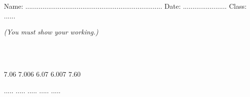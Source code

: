 \documentclass{article}
\date{}
\begin{document}
\fontsize{13}{15} \selectfont %

\begin{center}
  \qquad \\ 
\end{center} \\ 

Name: ........................................................................ \hspace{0.5cm}  Date: ....................... \hspace{0.5cm}  Class: ......

\par
\vspace*{10pt} 
\textit{(You must show your working.)  }
\vspace{10pt}

\hline
\vspace{10pt}

\par
{} \\
\vspace*{20pt}
\par

\begin{flushright}
\end{flushright}
 \vspace{10pt}

\hline
\vspace{10pt}

\par
{} \\

7.06 \hspace{3cm} 7.006 \hspace{3cm} 6.07 \hspace{3cm} 6.007 \hspace{3cm} 7.60 
\vspace{60pt}

 ..... \hspace{3cm} ..... \hspace{3cm}  ..... \hspace{3cm} ..... \hspace{3cm} .....  

\par
{} 
\vspace{10pt}
\end{document}
